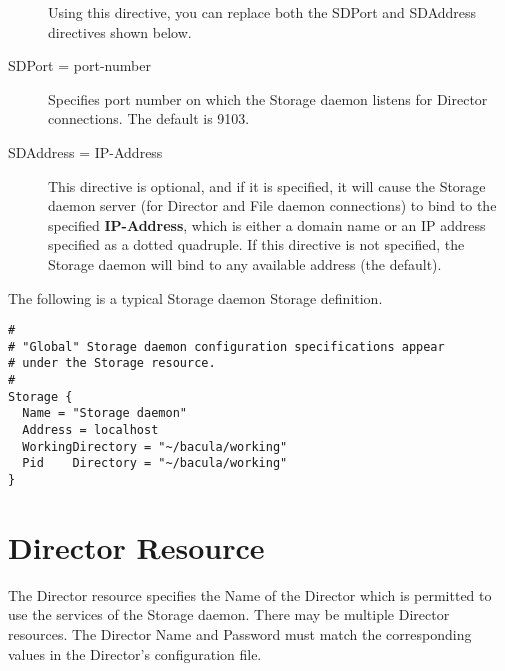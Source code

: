 \begin{description}
Using this directive, you can replace both the SDPort and SDAddress 
directives shown below. 

\item [SDPort = \lt{}port-number\gt{}]
   Specifies port number on which the Storage daemon  listens for Director
   connections. The default is 9103.  
   
\item [SDAddress = \lt{}IP-Address\gt{}]
   This directive is optional, and if it is specified, it will cause the
   Storage daemon server (for Director and File daemon connections) to bind
   to the specified {\bf IP-Address}, which is either a domain name or an
   IP address specified as a dotted quadruple.  If this directive is not
   specified, the Storage daemon will bind to any available address (the
   default).

\end{description}

The following is a typical Storage daemon Storage definition. 

\footnotesize
\begin{verbatim}
#
# "Global" Storage daemon configuration specifications appear
# under the Storage resource.
#
Storage {
  Name = "Storage daemon"
  Address = localhost
  WorkingDirectory = "~/bacula/working"
  Pid    Directory = "~/bacula/working"
}
\end{verbatim}
\normalsize

\section{Director Resource}
\label{DirectorResource1}

The Director resource specifies the Name of the Director which is permitted
to use the services of the Storage daemon.  There may be multiple Director
resources.  The Director Name and Password must match the corresponding
values in the Director's configuration file.

